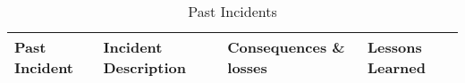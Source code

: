 \begin{landscape}
\begin{table}[]
\centering
\caption{Past Incidents }
\label{tab:past-incidents}
\begin{tabular}{@{}llll@{}}
\toprule
Past   Incident                                                                                    & Incident Description                                                                                                                                                                                                                                                                                                                                                                                                                                                                                                                                                                                                                                                                                                                    & Consequences \& losses                                                                                                                                                                                                                                                                           & Lessons Learned                                                                                                                                                                                                                                                                                                                                                                                                                                                                                                                                                                                                                        \\ \midrule

\end{tabular}
\end{table}
\end{landscape}
